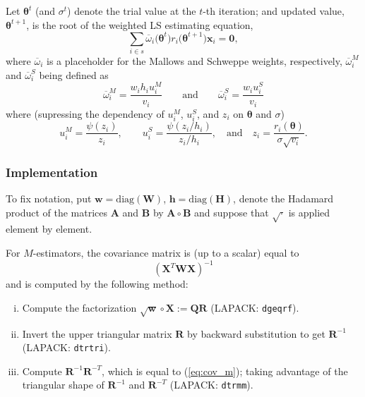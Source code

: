 \documentclass[a4paper,oneside,11pt,DIV=12]{scrartcl}
\newcommand{\code}[1]{{\texttt{#1}}}    %
\theoremstyle{remark}
\begin{document}
Let $\bm \theta^{t}$ (and $\sigma^{t}$) denote the trial value at the $t$-th iteration; and updated value, $\bm \theta^{t+1}$, is the root of the weighted LS estimating equation,
\begin{equation}
   \sum_{i \in s} \overline{\omega}_i \big( \bm \theta^t\big) r_i\big(\bm \theta^{t+1}\big) \bm x_i = \bm 0,
\end{equation}
\noindent where $\overline{\omega}_i$ is a placeholder for the Mallows and Schweppe weights, respectively, $\overline{\omega}_i^M$ and $\overline{\omega}_i^S$ being defined as
\begin{equation}
   \overline{\omega}_i^M = \frac{w_i h_i u_i^M}{v_i} \qquad \text{and} \qquad  \overline{\omega}_i^S = \frac{w_i u_i^S}{v_i}
\end{equation}
\noindent where (supressing the dependency of $u_i^M$, $u_i^S$, and $z_i$ on $\bm \theta$ and $\sigma$)
\begin{equation}
   u_i^M = \frac{\psi(z_i)}{z_i}, \qquad  u_i^S = \frac{\psi(z_i/h_i)}{z_i/h_i}, \quad \text{and} \quad z_i = \frac{r_i(\bm \theta)}{\sigma \sqrt{v_i}}.
\end{equation}



\subsubsection{Implementation}
To fix notation, put $\bm w =\mathrm{diag}(\bm W)$, $\bm h = \mathrm{diag}(\bm H)$, denote the Hadamard product of the matrices $\bm A$ and $\bm B$ by $\bm A\circ \bm B$ and suppose that $\sqrt{\cdot}$ is applied element by element.

For $M$-estimators, the covariance matrix is (up to a scalar) equal to
\begin{equation}\label{eq:cov_m}
   (\bm X^T \bm W \bm X)^{-1}
\end{equation}
\noindent and is computed by the following method:
\begin{enumerate}[i)]
   \item Compute the factorization $\sqrt{\bm w} \circ \bm X := \bm Q \bm R$ (LAPACK: \code{dgeqrf}).
   \item Invert the upper triangular matrix $\bm R$ by backward substitution to get $\bm R^{-1}$ (LAPACK: \code{dtrtri}).
   \item Compute $\bm R^{-1} \bm R^{-T}$, which is equal to (\ref{eq:cov_m}); taking advantage of the triangular shape of $\bm R^{-1}$ and $\bm R^{-T}$ (LAPACK: \code{dtrmm}).
\end{enumerate}
\end{document}
